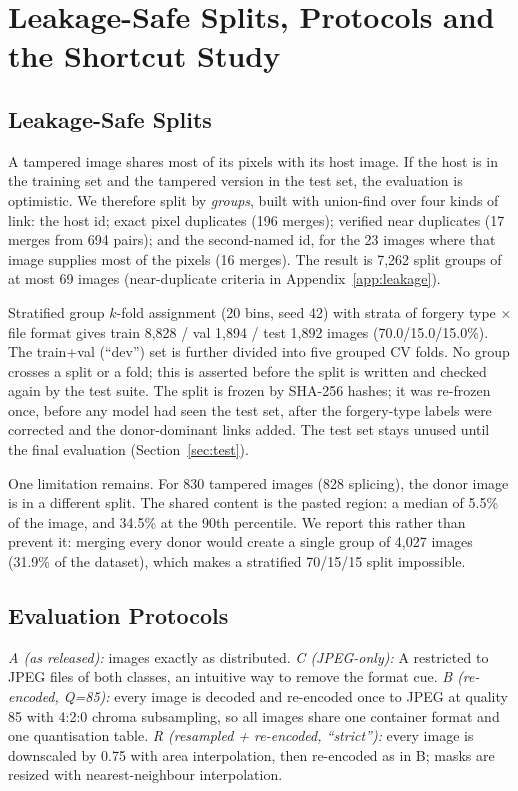 \section{Leakage-Safe Splits, Protocols and the Shortcut Study}\label{sec:leakage}

\subsection{Leakage-Safe Splits}\label{sec:leakage-splits}

A tampered image shares most of its pixels with its host image. If the host is in the training set and the tampered
version in the test set, the evaluation is optimistic. We therefore split by \emph{groups}, built with union-find
over four kinds of link: the host id; exact pixel duplicates (196 merges); verified near duplicates (17 merges from
694 pairs); and the second-named id, for the 23 images where that image supplies most of the pixels (16 merges).
The result is 7,262 split groups of at most 69 images (near-duplicate criteria in Appendix~\ref{app:leakage}).

Stratified group $k$-fold assignment (20 bins, seed 42) with strata of forgery type $\times$ file format gives
train 8,828 / val 1,894 / test 1,892 images (70.0/15.0/15.0\%). The train+val (``dev'') set is further
divided into five grouped CV folds. No group crosses a split or a fold; this is asserted before the split is
written and checked again by the test suite. The split is frozen by SHA-256 hashes; it was re-frozen once, before
any model had seen the test set, after the forgery-type labels were corrected and the donor-dominant links added.
The test set stays unused until the final evaluation (Section~\ref{sec:test}).

One limitation remains. For 830 tampered images (828 splicing), the donor image is in a different split. The shared
content is the pasted region: a median of 5.5\% of the image, and 34.5\% at the 90th percentile. We report this
rather than prevent it: merging every donor would create a single group of 4,027 images (31.9\% of the dataset),
which makes a stratified 70/15/15 split impossible.

\subsection{Evaluation Protocols}\label{sec:leakage-protocols}

\emph{A (as released):} images exactly as distributed. \emph{C (JPEG-only):} A restricted to JPEG files of both
classes, an intuitive way to remove the format cue. \emph{B (re-encoded, Q=85):} every image is decoded and re-encoded
once to JPEG at quality 85 with 4:2:0 chroma subsampling, so all images share one container format and one
quantisation table. \emph{R (resampled + re-encoded, ``strict''):} every image is downscaled by 0.75 with area
interpolation, then re-encoded as in B; masks are resized with nearest-neighbour interpolation.

